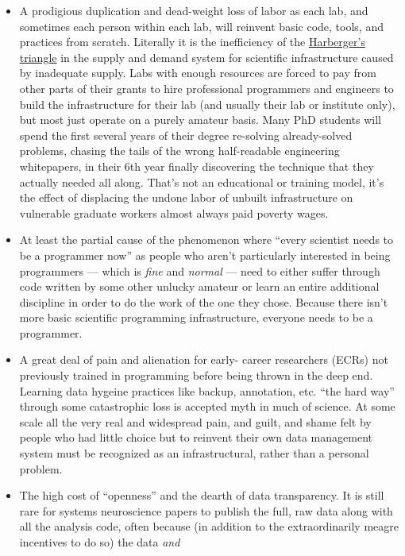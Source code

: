 \documentclass[10pt]{article}
\begin{document}
\begin{multicols}{2}
\begin{itemize}
\item
  A prodigious duplication and dead-weight loss of labor as each lab,
  and sometimes each person within each lab, will reinvent basic code,
  tools, and practices from scratch. Literally it is the inefficiency of
  the
  \href{https://en.wikipedia.org/wiki/Deadweight_loss\#Harberger's_triangle}{Harberger's
  triangle} in the supply and demand system for scientific
  infrastructure caused by inadequate supply. Labs with enough resources
  are forced to pay from other parts of their grants to hire
  professional programmers and engineers to build the infrastructure for
  their lab (and usually their lab or institute only), but most just
  operate on a purely amateur basis. Many PhD students will spend the
  first several years of their degree re-solving already-solved
  problems, chasing the tails of the wrong half-readable engineering
  whitepapers, in their 6th year finally discovering the technique that
  they actually needed all along. That's not an educational or training
  model, it's the effect of displacing the undone labor of unbuilt
  infrastructure on vulnerable graduate workers almost always paid
  poverty wages.
\item
  At least the partial cause of the phenomenon where ``every scientist
  needs to be a programmer now'' as people who aren't particularly
  interested in being programmers --- which is \emph{fine} and
  \emph{normal} --- need to either suffer through code written by some
  other unlucky amateur or learn an entire additional discipline in
  order to do the work of the one they chose. Because there isn't more
  basic scientific programming infrastructure, everyone needs to be a
  programmer.
\item
  A great deal of pain and alienation for early- career researchers
  (ECRs) not previously trained in programming before being thrown in
  the deep end. Learning data hygeine practices like backup, annotation,
  etc. ``the hard way'' through some catastrophic loss is accepted myth
  in much of science. At some scale all the very real and widespread
  pain, and guilt, and shame felt by people who had little choice but to
  reinvent their own data management system must be recognized as an
  infrastructural, rather than a personal problem.
\item
  The high cost of ``openness'' and the dearth of data transparency. It
  is still rare for systems neuroscience papers to publish the full, raw
  data along with all the analysis code, often because (in addition to
  the extraordinarily meagre incentives to do so) the data \emph{and}

\end{itemize}
\end{multicols}
\end{document}
